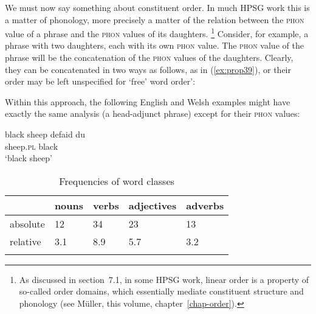 \documentclass[output=paper
	        ,collection
	        ,collectionchapter
 	        ,biblatex
                ,babelshorthands
                ,newtxmath
                ,draftmode
                ,colorlinks, citecolor=brown
]{langscibook}
\begin{document}
We must now say something about constituent order. In much HPSG work this is a matter of phonology, more precisely a matter of the relation between the \textsc{phon} value of a phrase and the \textsc{phon} values of its daughters.%
%
\footnote{As discussed in section~7.1, in some HPSG work, linear order is a property of so-called order domains, which essentially mediate constituent structure and phonology (see Müller, this volume, chapter~\ref{chap-order}). }
%
Consider, for example, a phrase with two daughters, each with its own \textsc{phon} value. The \textsc{phon} value of the phrase will be the concatenation of the \textsc{phon} values of the daughters. Clearly, they can be concatenated in two ways as follows, as in (\ref{ex:prop39}), or their order may be left unspecified for ‘free’ word order’:

\ea\label{ex:prop39}
\z

Within this approach, the following English and Welsh examples might have exactly the same analysis (a head-adjunct phrase) except for their \textsc{phon} values:

\ea\label{ex:prop40}
	\ea\label{ex:prop40a}
	black sheep
	\ex\label{ex:prop40b}
	\gll defaid du\\
	sheep.\textsc{pl} black\\
	\glt ‘black sheep’
	\z
\z


















	












\begin{table}
\caption{Frequencies of word classes}
\label{tab:1:frequencies}
 \begin{tabular}{lllll} %
  \lsptoprule
            & nouns & verbs & adjectives & adverbs\\ %
  \midrule
  absolute  &   12 &    34  &    23     & 13\\
  relative  &   3.1 &   8.9 &    5.7    & 3.2\\
  \lspbottomrule
 \end{tabular}
\end{table}
\end{document}
